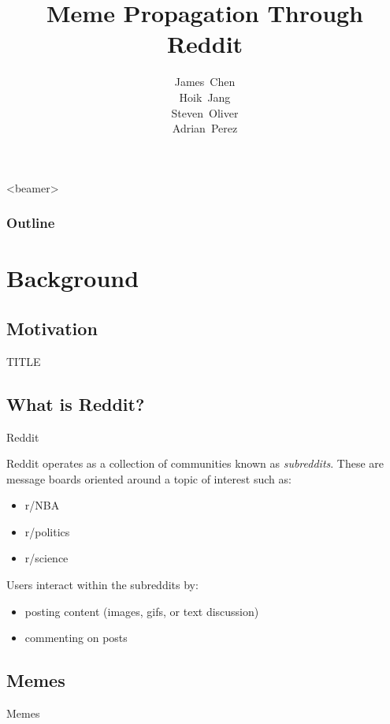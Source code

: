 \documentclass{beamer}
\title[Meme Propagation]{Meme Propagation Through Reddit}
\author[AUTHOR]{James~Chen \\ Hoik~Jang \\ Steven~Oliver \\ Adrian~Perez}
\institute
{
  Department of Statistics
}
\begin{document}

\begin{frame}
 \titlepage
\end{frame}

\begin{frame}<beamer>
  \frametitle{Outline}
  \tableofcontents
\end{frame}

\section{Background} %

\subsection{Motivation} %
\begin{frame}{TITLE}

\end{frame}

\subsection{What is Reddit?} %

\begin{frame}{Reddit}

Reddit operates as a collection of communities known as \textit{subreddits}.
These are message boards oriented around a topic of interest such as:
\begin{itemize}
\item r/NBA
\item r/politics
\item r/science
\end{itemize}
Users interact within the subreddits by:
\begin{itemize}
\item posting content (images, gifs, or text discussion)
\item commenting on posts
\end{itemize}
\end{frame}

\subsection{Memes} %
\begin{frame}{Memes}

\end{frame}
\end{document}

